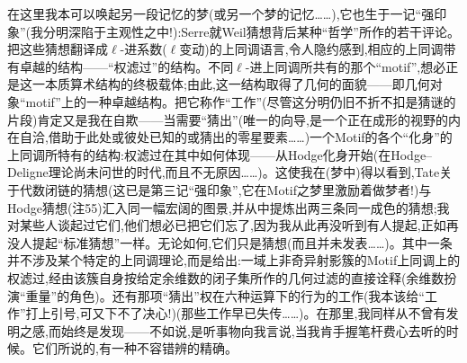在这里我本可以唤起另一段记忆的梦(或另一个梦的记忆……),它也生于一记“强印象”(我分明深陷于主观性之中!):Serre就Weil猜想背后某种“哲学”所作的若干评论。把这些猜想翻译成$\ell$-进系数($\ell$变动)的上同调语言,令人隐约感到,相应的上同调带有卓越的结构——“权滤过”的结构。不同$\ell$-进上同调所共有的那个“motif”,想必正是这一本质算术结构的终极载体;由此,这一结构取得了几何的面貌——即几何对象“motif”上的一种卓越结构。把它称作“工作”(尽管这分明仍旧不折不扣是猜谜的片段)肯定又是我在自欺——当需要“猜出”(唯一的向导,是一个正在成形的视野的内在自洽,借助于此处或彼处已知的或猜出的零星要素……)一个Motif的各个“化身”的上同调所特有的结构:权滤过\dmark{}在其中如何体现——从Hodge化身开始(在Hodge--Deligne理论尚未问世的时代,而且不无原因……)。这使我在(梦中)得以看到,Tate关于代数闭链的猜想(这已是第三记“强印象”,它在Motif之梦里激励着做梦者!)与Hodge猜想(注55)汇入同一幅宏阔的图景,并从中提炼出两三条同一成色的猜想;我对某些人谈起过它们,他们想必已把它们忘了,因为我从此再没听到有人提起,正如再没人提起“标准猜想”一样\dmark{}。无论如何,它们只是猜想(而且并未发表……)。其中一条并不涉及某个特定的上同调理论,而是给出:一域上非奇异射影簇的Motif上同调上的权滤过,经由该簇自身按给定余维数的闭子集所作的几何过滤的直接诠释(余维数扮演“重量”的角色)。还有那项“猜出”权在六种运算下的行为的工作(我本该给“工作”打上引号,可又下不了决心!)(那些工作早已失传……)。在那里,我同样从不曾有发明之感,而始终是发现——不如说,是听事物向我言说,当我肯手握笔杆费心去听的时候。它们所说的,有一种不容错辨的精确。

